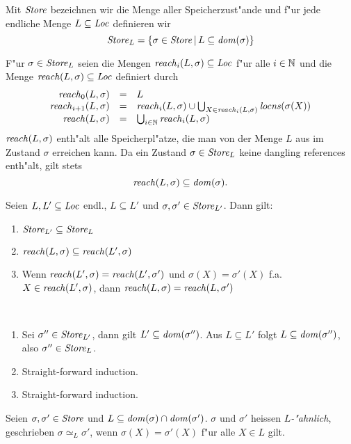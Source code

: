 \documentclass[12pt,a4paper,bigheadings]{scrartcl}
\newcommand{\locns}{\name{locns}}
\newcommand{\reach}{\name{reach}}
\begin{document}
Mit ${\text{\it Store\/}}$ bezeichnen wir die Menge aller Speicherzust"ande und f"ur jede endliche Menge
$L \subseteq {\text{\it Loc\/}}$ definieren wir
\[
  {\text{\it Store\/}}_L = \{\sigma\in{\text{\it Store\/}}\,|\,L\subseteq{\text{\it dom\/}}(\sigma)\}
\]

F"ur $\sigma\in{\text{\it Store\/}}_L$ seien die Mengen ${\text{\it reach\/}}_i(L,\sigma)\subseteq {\text{\it Loc\/}}$ f"ur alle
$i\in{\mathord{\mathbb N}}$ und die Menge ${\text{\it reach\/}}(L,\sigma)\subseteq{\text{\it Loc\/}}$ definiert durch
\[\begin{array}{rcl}
  \name{reach}_0(L,\sigma) & = & L \\
  \name{reach}_{i+1}(L,\sigma) & = & \name{reach}_i(L,\sigma)
             \cup \bigcup_{X\in\name{reach}_i(L,\sigma)} \locns(\sigma(X)) \\
  \name{reach}(L,\sigma) & = & \bigcup_{i\in\setN} \name{reach}_i(L,\sigma)
\end{array}\]
${\text{\it reach\/}}(L,\sigma)$ enth"alt alle Speicherpl"atze, die man von der Menge $L$ aus im
Zustand $\sigma$ erreichen kann. Da ein Zustand $\sigma\in{\text{\it Store\/}}_L$ keine dangling references
enth"alt, gilt stets
\[
  \reach(L,\sigma) \subseteq \dom{\sigma}.
\]

\begin{lemma} \label{lemma:Store_L_und_reach}
  Seien $L,L'\subseteq{\text{\it Loc\/}}$ endl., $L \subseteq L'$ und $\sigma,\sigma'\in{\text{\it Store\/}}_{L'}$. Dann gilt:
  \begin{enumerate}
    \item ${\text{\it Store\/}}_{L'} \subseteq {\text{\it Store\/}}_{L}$
    \item $\reach(L,\sigma) \subseteq \reach(L',\sigma)$
    \item Wenn $\reach(L',\sigma) = \reach(L',\sigma')$ und $\sigma(X) = \sigma'(X)$ f.a.
          $X\in\reach(L',\sigma)$, dann $\reach(L,\sigma) = \reach(L,\sigma')$
  \end{enumerate}
\end{lemma}

\begin{beweis} \
  \begin{enumerate}
    \item Sei $\sigma''\in{\text{\it Store\/}}_{L'}$, dann gilt $L' \subseteq {\text{\it dom\/}}(\sigma'')$. Aus $L \subseteq L'$ folgt
          $L\subseteq{\text{\it dom\/}}(\sigma'')$, also $\sigma''\in{\text{\it Store\/}}_L$.
    \item Straight-forward induction.
    \item Straight-forward induction.
  \end{enumerate}
\end{beweis}

\begin{definition}[$L$-"Ahnlichkeit]
  Seien $\sigma,\sigma'\in{\text{\it Store\/}}$ und $L \subseteq {\text{\it dom\/}}(\sigma) \cap {\text{\it dom\/}}(\sigma')$. $\sigma$ und $\sigma'$
  heissen {\em $L$-"ahnlich}, geschrieben $\sigma \simeq_L \sigma'$, wenn $\sigma(X) = \sigma'(X)$ f"ur
  alle $X \in L$ gilt.
\end{definition}
\end{document}
